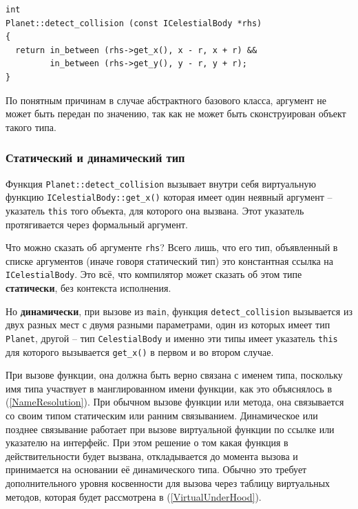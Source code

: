 \documentclass[a4paper,12pt,oneside]{article}
\begin{document}
\begin{lstlisting}
int 
Planet::detect_collision (const ICelestialBody *rhs)
{
  return in_between (rhs->get_x(), x - r, x + r) && 
         in_between (rhs->get_y(), y - r, y + r);
}
\end{lstlisting}

По понятным причинам в случае абстрактного базового класса, аргумент не может быть передан по значению, так как не может быть сконструирован объект такого типа.

\subsubsection{Статический и динамический тип}\label{StatDynPoly}

Функция \lstinline!Planet::detect_collision! вызывает внутри себя виртуальную функцию \lstinline!ICelestialBody::get_x()! которая имеет один неявный аргумент -- указатель \lstinline!this! того объекта, для которого она вызвана. Этот указатель протягивается через формальный аргумент. 

Что можно сказать об аргументе \lstinline!rhs!? Всего лишь, что его тип, объявленный в списке аргументов (иначе говоря статический тип) это константная ссылка на \lstinline!ICelestialBody!. Это всё, что компилятор может сказать об этом типе \textbf{статически}, без контекста исполнения.

Но \textbf{динамически}, при вызове из \lstinline!main!, функция \lstinline!detect_collision! вызывается из двух разных мест с двумя разными параметрами, один из которых имеет тип \lstinline!Planet!, другой – тип \lstinline!CelestialBody! и именно эти типы имеет указатель \lstinline!this! для которого вызывается \lstinline!get_x()! в первом и во втором случае.

При вызове функции, она должна быть верно связана с именем типа, поскольку имя типа участвует в манглированном имени функции, как это объяснялось в (\ref{NameResolution}). При обычном вызове функции или метода, она связывается со своим типом статическим или ранним связыванием. Динамическое или позднее связывание работает при вызове виртуальной функции по ссылке или указателю на интерфейс. При этом решение о том какая функция в действительности будет вызвана, откладывается до момента вызова и принимается на основании её динамического типа. Обычно это требует дополнительного уровня косвенности для вызова через таблицу виртуальных методов, которая будет рассмотрена в (\ref{VirtualUnderHood}).
\end{document}
